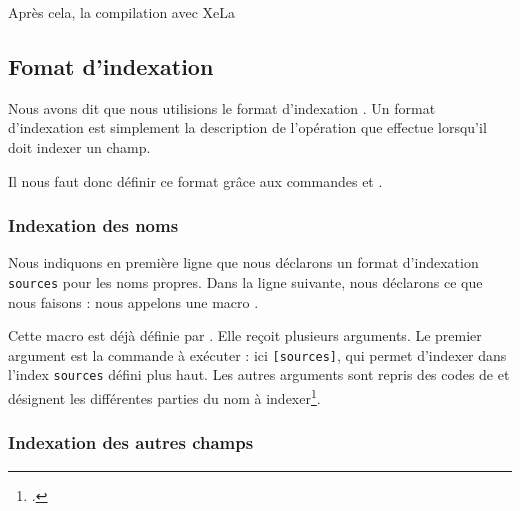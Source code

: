 Après cela, la compilation avec XeLa

\subsection{Fomat d'indexation }

Nous avons dit que nous utilisions le format d'indexation . Un format d'indexation   est simplement la description de l'opération que  effectue lorsqu'il doit indexer un champ. 

Il nous faut donc définir ce format grâce aux commandes  et .

\subsubsection{Indexation des noms}

\begin{english}
\begin{latexcode}
\end{latexcode}
\end{english}

Nous indiquons en première ligne que nous déclarons un format d'indexation \verb|sources| pour les noms propres. Dans la ligne suivante, nous déclarons ce que nous faisons : nous appelons une macro . 

Cette macro est déjà définie par . Elle reçoit plusieurs arguments. Le premier argument est la commande à exécuter : ici \verb|[sources]|, qui permet d'indexer dans l'index \verb|sources| défini plus haut. Les autres arguments sont repris des codes de  et désignent les différentes parties du nom à indexer\footcite[Nous renvoyons le lecteur à la documentation de  : ][]{biblatex_formats}.


\subsubsection{Indexation des autres champs}

\begin{latexcode}
\end{latexcode}

